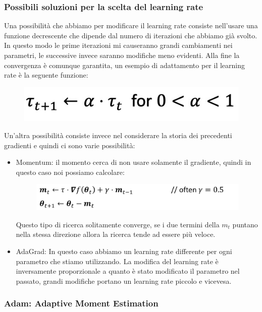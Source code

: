 \documentclass[14pt]{extreport}
\begin{document}
\subsubsection{Possibili soluzioni per la scelta del learning rate}


Una possibilità che abbiamo per modificare il learning rate consiste nell'usare una funzione decrescente che dipende dal numero di iterazioni che
abbiamo già svolto. In questo modo le prime iterazioni mi causeranno grandi cambiamenti nei parametri, le successive invece saranno modifiche meno
evidenti. Alla fine la convergenza è comunque garantita, un esempio di adattamento per il learning rate è la seguente funzione:

\begin{figure}[H]
\centering
\includegraphics[width=0.4\linewidth]{249.jpeg}
\end{figure}

Un'altra possibilità consiste invece nel considerare la storia dei precedenti gradienti e quindi ci sono varie possibilità:

\begin{itemize}
\item Momentum: il momento cerca di non usare solamente il gradiente, quindi in questo caso noi possiamo calcolare: \begin{figure}[H]
\centering
\includegraphics[width=0.7\linewidth]{250.jpeg}
\end{figure}
Questo tipo di ricerca solitamente converge, se i due termini della $m_t$ puntano nella stessa direzione allora la ricerca tende ad essere più veloce.

\item AdaGrad: In questo caso abbiamo un learning rate differente per ogni parametro che stiamo utilizzando. La modifica del learning rate è
inversamente proporzionale a quanto è stato modificato il parametro nel passato, grandi modifiche portano un learning rate piccolo e vicevesa.
\end{itemize}

\subsubsection{Adam: Adaptive Moment Estimation}
\end{document}
